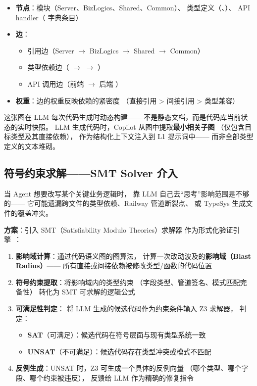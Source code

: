 \documentclass[10pt, openany]{book}
\begin{document}
\begin{itemize}
    \item \textbf{节点}：模块（Server、BizLogics、Shared、Common）、
        类型定义（、）、
        API handler（ 字典条目）
    \item \textbf{边}：
        \begin{itemize}
            \item 引用边（Server \(\to\) BizLogics \(\to\) Shared \(\to\) Common）
            \item 类型依赖边（ \(\to\)  \(\to\) ）
            \item API 调用边（前端  \(\to\) 后端 ）
        \end{itemize}
    \item \textbf{权重}：边的权重反映依赖的紧密度
        （直接引用 > 间接引用 > 类型兼容）
\end{itemize}

这张图在 LLM 每次代码生成时动态构建——
不是静态文档，而是代码库当前状态的实时快照。
LLM 生成代码时，Copilot 从图中提取\textbf{最小相关子图}
（仅包含目标类型及其直接依赖），
作为结构化上下文注入到 L1 提示词中——
而非全部类型定义的文本堆砌。

\subsection{符号约束求解——SMT Solver 介入}

当 Agent 想要改写某个关键业务逻辑时，
靠 LLM 自己去``思考''影响范围是不够的——
它可能遗漏跨文件的类型依赖、Railway 管道断裂点、
或 TypeSys 生成文件的覆盖冲突。

\textbf{方案}：引入 SMT（Satisfiability Modulo Theories）求解器
作为形式化验证引擎~\cite{Moura2008Z3}：

\begin{enumerate}
    \item \textbf{影响域计算}：通过代码语义图的图算法，
        计算一次改动波及的\textbf{影响域（Blast Radius）}——
        所有直接或间接依赖被修改类型/函数的代码位置
    
    \item \textbf{符号约束提取}：将影响域内的类型约束
        （字段类型、管道签名、模式匹配完备性）
        转化为 SMT 可求解的逻辑公式
    
    \item \textbf{可满足性判定}：
        将 LLM 生成的候选代码作为约束条件输入 Z3 求解器，
        判定：
        \begin{itemize}
            \item \textbf{SAT}（可满足）：候选代码在符号层面与现有类型系统一致
            \item \textbf{UNSAT}（不可满足）：候选代码存在类型冲突或模式不匹配
        \end{itemize}
    
    \item \textbf{反例生成}：UNSAT 时，Z3 可生成一个具体的反例向量
        （哪个类型、哪个字段、哪个约束被违反），
        反馈给 LLM 作为精确的修复指令
\end{enumerate}
\end{document}

